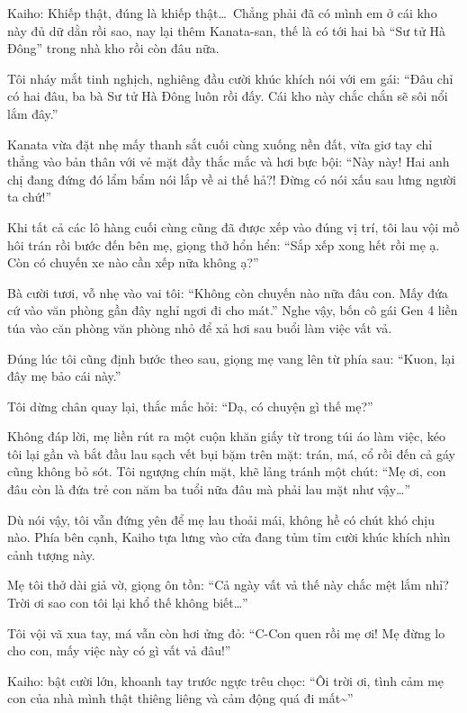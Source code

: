 \documentclass[../main.tex]{subfiles}
\begin{document}
Kaiho:	Khiếp thật, đúng là khiếp thật\dots\ Chẳng phải đã có mình em ở cái kho này đủ dữ dằn rồi sao, nay lại thêm Kanata-san, thế là có tới hai bà “Sư tử Hà Đông” trong nhà kho rồi còn đâu nữa.

Tôi nháy mắt tinh nghịch, nghiêng đầu cười khúc khích nói với em gái: ``Đâu chỉ có hai đâu, ba bà Sư tử Hà Đông luôn rồi đấy. Cái kho này chắc chắn sẽ sôi nổi lắm đây.''

Kanata vừa đặt nhẹ mấy thanh sắt cuối cùng xuống nền đất, vừa giơ tay chỉ thẳng vào bản thân với vẻ mặt đầy thắc mắc và hơi bực bội: ``Này này! Hai anh chị đang đứng đó lẩm bẩm nói lắp về ai thế hả?! Đừng có nói xấu sau lưng người ta chứ!''

\ct

Khi tất cả các lô hàng cuối cùng cũng đã được xếp vào đúng vị trí, tôi lau vội mồ hôi trán rồi bước đến bên mẹ, giọng thở hổn hển: ``Sắp xếp xong hết rồi mẹ ạ. Còn có chuyến xe nào cần xếp nữa không ạ?''

Bà cười tươi, vỗ nhẹ vào vai tôi: ``Không còn chuyến nào nữa đâu con. Mấy đứa cứ vào văn phòng gần đây nghỉ ngơi đi cho mát.'' Nghe vậy, bốn cô gái Gen 4 liền túa vào căn phòng văn phòng nhỏ để xả hơi sau buổi làm việc vất vả.

Đúng lúc tôi cũng định bước theo sau, giọng mẹ vang lên từ phía sau: ``Kuon, lại đây mẹ bảo cái này.''

Tôi dừng chân quay lại, thắc mắc hỏi: ``Dạ, có chuyện gì thế mẹ?''

Không đáp lời, mẹ liền rút ra một cuộn khăn giấy từ trong túi áo làm việc, kéo tôi lại gần và bắt đầu lau sạch vết bụi bặm trên mặt: trán, má, cổ rồi đến cả gáy cũng không bỏ sót. Tôi ngượng chín mặt, khẽ lảng tránh một chút: ``Mẹ ơi, con đâu còn là đứa trẻ con năm ba tuổi nữa đâu mà phải lau mặt như vậy\dots''

Dù nói vậy, tôi vẫn đứng yên để mẹ lau thoải mái, không hề có chút khó chịu nào. Phía bên cạnh, Kaiho tựa lưng vào cửa đang tủm tỉm cười khúc khích nhìn cảnh tượng này.

Mẹ tôi thở dài giả vờ, giọng ôn tồn: ``Cả ngày vất vả thế này chắc mệt lắm nhỉ? Trời ơi sao con tôi lại khổ thế không biết\dots''

Tôi vội vã xua tay, má vẫn còn hơi ửng đỏ: ``C-Con quen rồi mẹ ơi! Mẹ đừng lo cho con, mấy việc này có gì vất vả đâu!''

Kaiho: bật cười lớn, khoanh tay trước ngực trêu chọc: ``Ôi trời ơi, tình cảm mẹ con của nhà mình thật thiêng liêng và cảm động quá đi mất\~{}''
\end{document}
